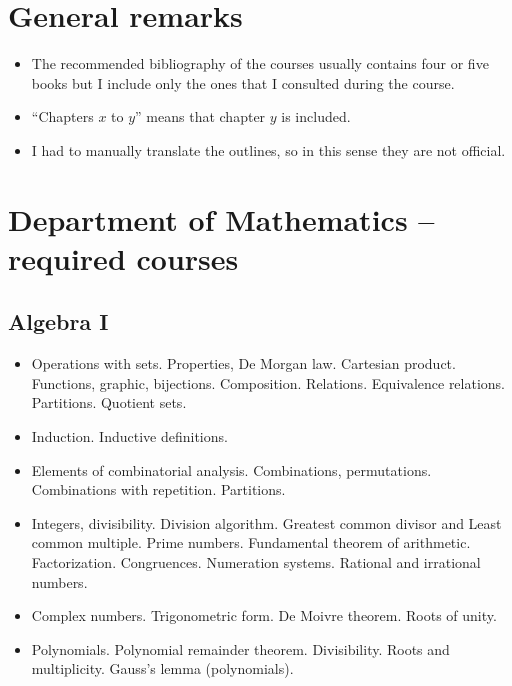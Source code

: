 \documentclass[spanish]{article}
\begin{document}
\section{General remarks}
\begin{itemize}
  \item
  The recommended bibliography of the courses usually contains four or five books
  but I include only the ones that I consulted during the course.

  \item
  ``Chapters $x$ to $y$'' means that chapter $y$ is included.

  \item
  I had to manually translate the outlines, so in this sense they are not
  official.
\end{itemize}

\section{Department of Mathematics -- required courses}

\subsection{Algebra I}

\begin{itemize}
  \item
Operations with sets. Properties, De Morgan law. Cartesian product. Functions,
graphic, bijections. Composition. Relations. Equivalence relations. Partitions.
Quotient sets.

  \item
Induction. Inductive definitions.

  \item
Elements of combinatorial analysis. Combinations, permutations. Combinations
with repetition. Partitions.

  \item
Integers, divisibility. Division algorithm. Greatest common divisor and Least
common multiple. Prime numbers. Fundamental theorem of arithmetic. Factorization.
Congruences. Numeration systems. Rational and irrational numbers.

  \item
Complex numbers. Trigonometric form. De Moivre theorem. Roots of unity.

  \item
Polynomials. Polynomial remainder theorem. Divisibility. Roots and multiplicity.
Gauss's lemma (polynomials).
\end{itemize}
\end{document}
